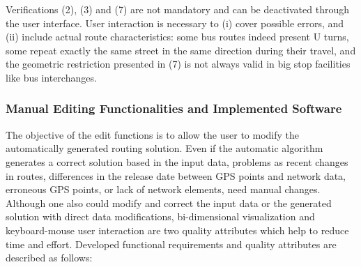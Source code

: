 Verifications (2), (3) and (7) are not mandatory and can be deactivated through the user interface. User interaction is necessary to (i) cover possible errors, and (ii) include actual route characteristics: some bus routes indeed present U turns, some repeat exactly the same street in the same direction during their travel, and the geometric restriction presented in (7) is not always valid in big stop facilities like bus interchanges.

\subsubsection{Manual Editing Functionalities and Implemented Software}
The objective of the edit functions is to allow the user to modify the automatically generated routing solution. Even if the automatic algorithm generates a correct solution based in the input data, problems as recent changes in routes, differences in the release date between GPS points and network data, erroneous GPS points, or lack of network elements, need manual changes. Although one also could modify and correct the input data or the generated solution with direct data modifications, bi-dimensional visualization and keyboard-mouse user interaction are two quality attributes which help to reduce time and effort. Developed functional requirements and quality attributes are described as follows:

